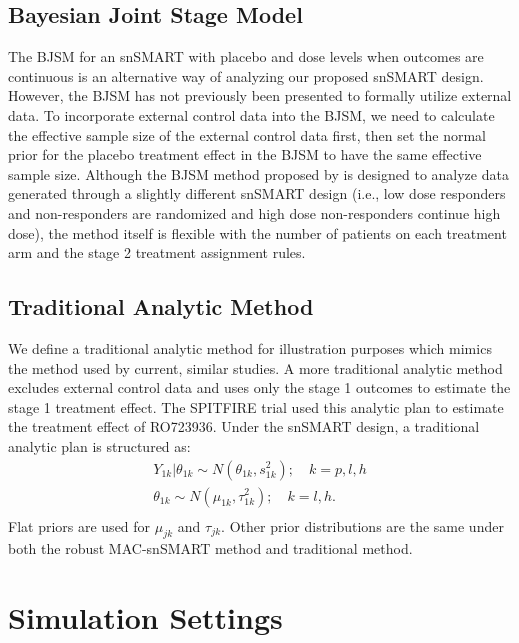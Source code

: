 \subsection{Bayesian Joint Stage Model}
The \ac{BJSM} for an \ac{snSMART} with placebo and dose levels when outcomes are continuous \citep{fang2022comparing} is an alternative way of analyzing our proposed \ac{snSMART} design. However, the \ac{BJSM} has not previously been presented to formally utilize external data. To incorporate external control data into the \ac{BJSM}, we need to calculate the effective sample size of the external control data first, then set the normal prior for the placebo treatment effect in the \ac{BJSM} to have the same effective sample size. Although the \ac{BJSM} method proposed by \cite{fang2022comparing} is designed to analyze data generated through a slightly different \ac{snSMART} design (i.e., low dose responders and non-responders are randomized and high dose non-responders continue high dose), the method itself is flexible with the number of patients on each treatment arm and the stage 2 treatment assignment rules. 
\subsection{Traditional Analytic Method}
We define a traditional analytic method for illustration purposes which mimics the method used by current, similar studies. A more traditional analytic method excludes external control data and uses only the stage 1 outcomes to estimate the stage 1 treatment effect. The SPITFIRE trial used this analytic plan to estimate the treatment effect of RO723936. Under the \ac{snSMART} design, a traditional analytic plan is structured as:
\begin{equation}\label{eq:indwo}
\begin{array}{l}
Y_{1k}|\theta_{1k} \sim N(\theta_{1k}, s_{1k}^2); \quad  k = p, l, h \\
\theta_{1k} \sim N(\mu_{1k}, \tau_{1k}^2); \quad k = l, h. \\
\end{array}
\end{equation}
Flat priors are used for $\mu_{jk}$ and $\tau_{jk}$. Other prior distributions are the same under both the robust \ac{MAC}-snSMART method and traditional method.

\section{Simulation Settings} \label{s:simulation}

